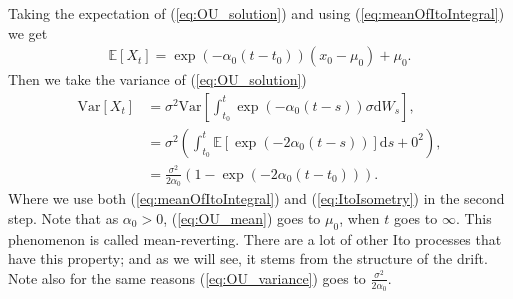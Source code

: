 Taking the expectation of (\ref{eq:OU_solution}) and using (\ref{eq:meanOfItoIntegral}) we get
\begin{align}
    \mathbb{E}\left[X_t\right] = \exp\left(-\alpha_0\left(t - t_0\right)\right)\left(x_0 - \mu_0\right) + \mu_0. \label{eq:OU_mean}
\end{align}
Then we take the variance of (\ref{eq:OU_solution})
\begin{align}
    \mathrm{Var}\left[X_t\right] &= \sigma^2\mathrm{Var}\left[\int_{t_0}^t \exp\left(-\alpha_0 \left(t - s\right)\right)\sigma \mathrm{d}W_s\right],\nonumber \\
    & = \sigma^2\left(\int_{t_0}^t \mathbb{E}\left[\exp\left(-2\alpha_0\left(t - s\right)\right)\right] \mathrm{d}s + 0^2 \right), \nonumber \\
    & = \frac{\sigma^2}{2\alpha_0}\left(1 - \exp\left(-2\alpha_0(t - t_0)\right)\right). \label{eq:OU_variance}
\end{align}
Where we use both (\ref{eq:meanOfItoIntegral}) and (\ref{eq:ItoIsometry}) in the second step. Note that as $\alpha_0 > 0$, (\ref{eq:OU_mean}) goes to $\mu_0$, when $t$ goes to $\infty$. This phenomenon is called mean-reverting. There are a lot of other Ito processes that have this property; and as we will see, it stems from the structure of the drift. Note also for the same reasons (\ref{eq:OU_variance}) goes to $\frac{\sigma^2}{2\alpha_0}$.
